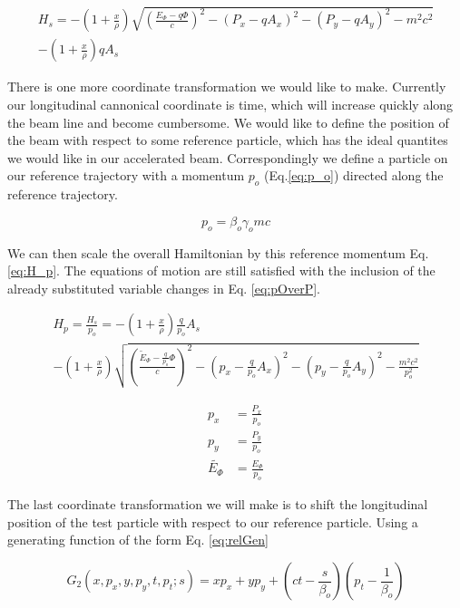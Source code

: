\begin{multline} \label{eq:H_s}
	H_s = -\left(1 + \frac{x}{\rho}\right)\sqrt{\left(\frac{E_{\Phi} - q\Phi}{c}\right)^2 - (P_x -q A_x)^2 - (P_y - q A_y)^2 - m^2c^2}\\ - \left(1 + \frac{x}{\rho}\right)qA_s
\end{multline}

There is one more coordinate transformation we would like to make. Currently our longitudinal cannonical coordinate is time, which will increase quickly along the beam line and become cumbersome. We would like to define the position of the beam with respect to some reference particle, which has the ideal quantites we would like in our accelerated beam. Correspondingly we define a particle on our reference trajectory with a momentum $p_o$ (Eq.\ref{eq:p_o}) directed along the reference trajectory.

\begin{equation} \label{eq:p_o}
	p_o = \beta_o \gamma_o m c
\end{equation}

We can then scale the overall Hamiltonian by this reference momentum Eq. \ref{eq:H_p}. The equations of motion are still satisfied with the inclusion of the already substituted variable changes in Eq. \ref{eq:pOverP}.

\begin{multline} \label{eq:H_p}
	H_p = \frac{H_s}{p_o} = - \left(1 + \frac{x}{\rho}\right)\frac{q}{p_o}A_s\\
-\left(1 + \frac{x}{\rho}\right)\sqrt{\left(\frac{\tilde{E}_{\Phi} - \frac{q}{p_o}\Phi}{c}\right)^2 - \left(p_x -\frac{q}{p_o} A_x\right)^2 - \left(p_y - \frac{q}{p_o} A_y\right)^2 - \frac{m^2c^2}{p_o^2}}
\end{multline}


\begin{equation} \label{eq:pOverP}
\begin{split}
	p_x &= \frac{P_x}{p_o}\\
	p_y &= \frac{P_y}{p_o}\\
	\tilde{E_{\Phi}} &= \frac{E_{\Phi}}{p_o}
\end{split}
\end{equation}

The last coordinate transformation we will make is to shift the longitudinal position of the test particle with respect to our reference particle. Using a generating function of the form Eq. \ref{eq:relGen}


\begin{equation} \label{eq:relGen}
	G_2(x,p_x,y,p_y,t,p_t;s) = x p_x  + y p_y + \left(ct - \frac{s}{\beta_o}\right)\left(p_t - \frac{1}{\beta_o}\right)
\end{equation}

